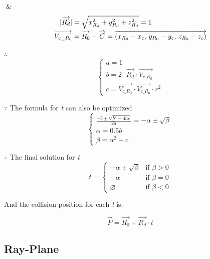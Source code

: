 $\And$
\[
\begin{array}{lr}
\begin{aligned}
\lvert \overrightarrow{R_d} \rvert &= \sqrt{x_{R_d}^2 + y_{R_d}^2 + z_{R_d}^2} = 1 \\
\overrightarrow{V_{c\_R_0}} &= \overrightarrow{R_0} - \overrightarrow{C} = \overrightarrow{(x_{R_0} - x_c,\,y_{R_0} - y_c,\,z_{R_0} - z_c)}
\end{aligned}
\end{array}
\]

$\therefore$
\[
\left\{
\begin{array}{lr}
a =1 \\
b = 2 \cdot \overrightarrow{R_d} \cdot \overrightarrow{V_{c\_R_0}} \\
c = \overrightarrow{V_{c\_R_0}} \cdot \overrightarrow{V_{c\_R_0}} \cdot r^2
\end{array}
\right.
\]

$\because$ The formula for \emph{t} can also be optimized
\[
\left\{
\begin{array}{lr}
\frac{-b \pm \sqrt{b^2 - 4ac}}{2a} = -\alpha \pm \sqrt{\beta} \\
\alpha = 0.5b \\
\beta = \alpha^2 - c
\end{array}
\right.
\]

$\therefore$ The final solution for \emph{t}
\[
t =
\begin{cases}
 -\alpha \pm \sqrt{\beta} & \text{if } \beta > 0 \\
-\alpha & \text{if } \beta = 0 \\
\varnothing & \text{if } \beta < 0
\end{cases}
\]

And the collision position for each \emph{t} is:

\[
\overrightarrow{P} = \overrightarrow{R_0} + \overrightarrow{R_d} \cdot t
\]

\subsection{Ray-Plane}

